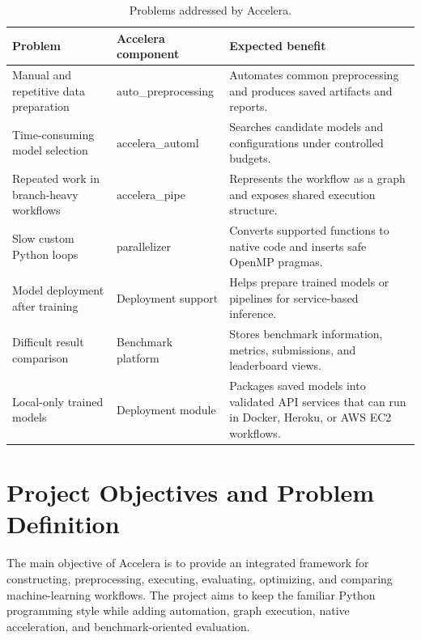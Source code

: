 \documentclass[12pt,a4paper]{report}
\newcommand{\acceleraTableStyle}{%
\small
\renewcommand{\arraystretch}{1.15}
\setlength{\tabcolsep}{4pt}%
}
\begin{document}
\begin{table}[!htbp]
\centering
\acceleraTableStyle
\caption{Problems addressed by Accelera.}
\label{tab:intro-problems-solutions}
\begin{tabular}{p{}p{}p{}}
\toprule
\textbf{Problem} & \textbf{Accelera component} & \textbf{Expected benefit} \\
\midrule

Manual and repetitive data preparation &
auto\_preprocessing &
Automates common preprocessing and produces saved artifacts and reports. \\
\midrule

Time-consuming model selection &
accelera\_automl &
Searches candidate models and configurations under controlled budgets. \\
\midrule

Repeated work in branch-heavy workflows &
accelera\_pipe &
Represents the workflow as a graph and exposes shared execution structure. \\
\midrule

Slow custom Python loops &
parallelizer &
Converts supported functions to native code and inserts safe OpenMP pragmas. \\
\midrule

Model deployment after training &
Deployment support &
Helps prepare trained models or pipelines for service-based inference. \\
\midrule

Difficult result comparison &
Benchmark platform &
Stores benchmark information, metrics, submissions, and leaderboard views. \\
\midrule

Local-only trained models &
Deployment module &
Packages saved models into validated API services that can run in Docker,
Heroku, or AWS EC2 workflows. \\

\bottomrule
\end{tabular}
\end{table}

\section{Project Objectives and Problem Definition}

The main objective of Accelera is to provide an integrated framework for
constructing, preprocessing, executing, evaluating, optimizing, and comparing
machine-learning workflows. The project aims to keep the familiar Python
programming style while adding automation, graph execution, native acceleration,
and benchmark-oriented evaluation.
\end{document}
